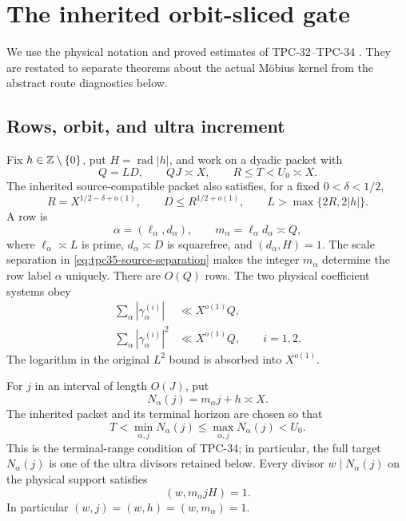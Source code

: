 \section{The inherited orbit-sliced gate}
\label{sec:tpc35-inherited-gate}

We use the physical notation and proved estimates of TPC-32--TPC-34
\citep{WangTPC32,WangTPC33,WangTPC34}.  They are restated to separate theorems about
the actual M\"obius kernel from the abstract route diagnostics below.

\subsection{Rows, orbit, and ultra increment}

Fix \(h\in\mathbb Z\setminus\{0\}\), put \(H=\operatorname{rad}|h|\), and work
on a dyadic packet with
\begin{equation}
 Q=LD,\qquad QJ\asymp X,\qquad R\le T<U_0\asymp X.
 \label{eq:tpc35-scales}
\end{equation}
The inherited source-compatible packet also satisfies, for a fixed
\(0<\delta<1/2\),
\begin{equation}
 R=X^{1/2-\delta+o(1)},\qquad
 D\le R^{1/2+o(1)},\qquad
 L>\max\{2R,2|h|\}.
 \label{eq:tpc35-source-separation}
\end{equation}
A row is
\begin{equation}
 \alpha=(\ell_\alpha,d_\alpha),\qquad
 m_\alpha=\ell_\alpha d_\alpha\asymp Q,
 \label{eq:tpc35-row}
\end{equation}
where \(\ell_\alpha\asymp L\) is prime, \(d_\alpha\asymp D\) is
squarefree, and \((d_\alpha,H)=1\).  The scale separation in
\eqref{eq:tpc35-source-separation} makes the integer \(m_\alpha\)
determine the row label \(\alpha\) uniquely.  There are \(O(Q)\) rows.
The two physical coefficient systems obey
\begin{align}
 \sum_\alpha|\gamma_\alpha^{(i)}|&\ll X^{o(1)}Q,
 \label{eq:tpc35-row-l1}\\
 \sum_\alpha|\gamma_\alpha^{(i)}|^2&\ll X^{o(1)}Q,
 \qquad i=1,2.
 \label{eq:tpc35-row-l2}
\end{align}
The logarithm in the original \(L^2\) bound is absorbed into \(X^{o(1)}\).

For \(j\) in an interval of length \(O(J)\), put
\begin{equation}
 N_\alpha(j)=m_\alpha j+h\asymp X.
 \label{eq:tpc35-target}
\end{equation}
The inherited packet and its terminal horizon are chosen so that
\begin{equation}
 T<\min_{\alpha,j}N_\alpha(j)
 \le \max_{\alpha,j}N_\alpha(j)<U_0.
 \label{eq:tpc35-terminal-range}
\end{equation}
This is the terminal-range condition of TPC-34; in particular, the full
target \(N_\alpha(j)\) is one of the ultra divisors retained below.
Every divisor \(w\mid N_\alpha(j)\) on the physical support satisfies
\begin{equation}
 (w,m_\alpha jH)=1.
 \label{eq:tpc35-divisor-primitivity}
\end{equation}
In particular \((w,j)=(w,h)=(w,m_\alpha)=1\).

